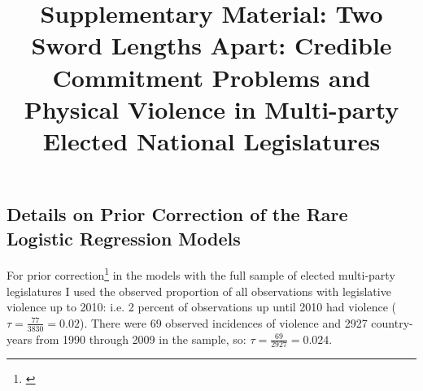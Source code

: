 \documentclass[a4paper]{article}\usepackage[]{graphicx}\usepackage[]{color}
\title{Supplementary Material: Two Sword Lengths Apart: Credible Commitment Problems and Physical Violence in Multi-party Elected National Legislatures}
\begin{document}
\maketitle







\subsection*{Details on Prior Correction of the Rare Logistic Regression Models}

For prior correction\footnote{\citep[see][]{KingRareEventsPA2001}} in the models with the full sample of elected multi-party legislatures I used the observed proportion of all observations with legislative violence up to 2010: i.e. 2 percent of observations up until 2010 had violence ($\tau = \frac{77}{3830} = 0.02$). There were 69 observed incidences of violence and 2927 country-years from 1990 through 2009 in the sample, so: $\tau = \frac{69}{2927} = 0.024$.
\end{document}
